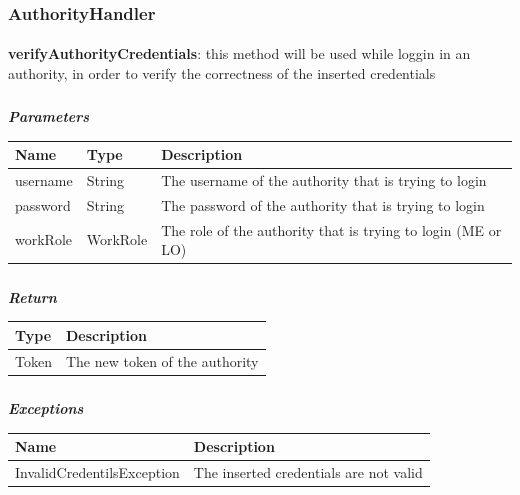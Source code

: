 				\clearpage
				\subsubsection{AuthorityHandler}	
					\paragraph{}
							\textbf{verifyAuthorityCredentials}: this method will be used while loggin in an authority, in order to verify the correctness of the inserted credentials
							\subparagraph{}
							\vspace{-3mm}
							\textit{\textbf{Parameters}}
							\vspace{-2mm}
								\begin{table}[!h]
									\begin{tabular}{L{0.15\textwidth}L{0.15\textwidth}L{0.5\textwidth}}
										\toprule
										\textbf{Name} & \textbf{Type} & \textbf{Description} \\
										\midrule
								  		username & String & The username of the authority that is trying to login \\
										password & String & The password of the authority that is trying to login \\
										workRole & WorkRole & The role of the authority that is trying to login (ME or LO) \\
								 		\bottomrule
									\end{tabular}
								\end{table}
							\subparagraph{}
							\vspace{-6mm}
								\textit{\textbf{Return}}
								\vspace{-2mm}
									\begin{table}[!h]
									\begin{tabular}{ll}
										\toprule
										\textbf{Type} & \textbf{Description} \\
										\midrule
								  		Token & The new token of the authority \\
								 		\bottomrule
									\end{tabular}
								\end{table}
							\subparagraph{}
							\vspace{-6mm}
								\textit{\textbf{Exceptions}}
								\vspace{-2mm}
									\begin{table}[!h]
									\begin{tabular}{ll}
										\toprule
										\textbf{Name} & \textbf{Description} \\
										\midrule
								  		InvalidCredentilsException & The inserted credentials are not valid \\ 
								 		\bottomrule
									\end{tabular}
								\end{table}
								
